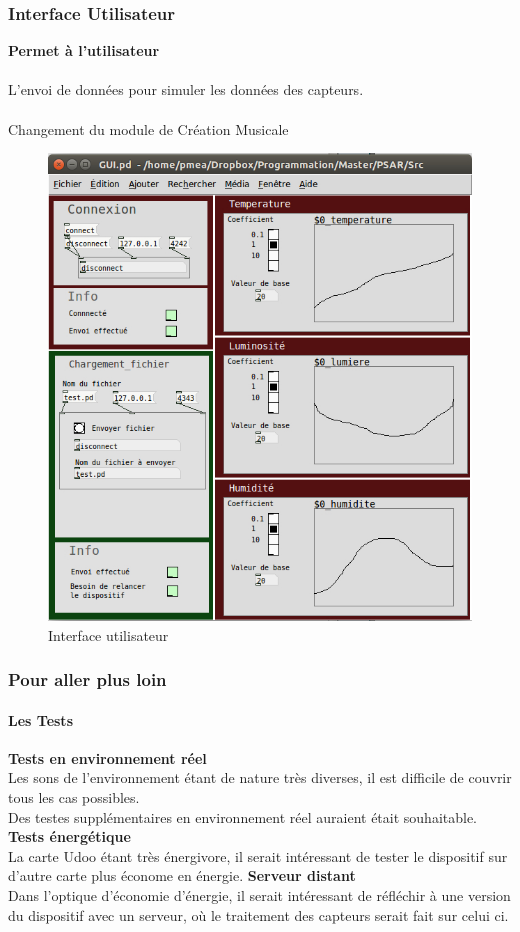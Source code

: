 \documentclass{beamer}
\begin{document}
\begin{frame}
\frametitle{Interface Utilisateur}
\begin{minipage}{0.49\textwidth}
\textbf{Permet à l'utilisateur}\\\\
L'envoi de données pour simuler les données des capteurs.\\\\
Changement du module de Création Musicale
\end{minipage}
\begin{minipage}{0.49\textwidth}
\begin{figure}
  \centering
  \includegraphics[width=\textwidth]{GUI.jpg} 
	\caption{Interface utilisateur}
\end{figure}
\end{minipage}
\end{frame}


\begin{frame}
\frametitle{Pour aller plus loin}
\framesubtitle{Les Tests}
\textbf{Tests en environnement réel}\\
Les sons de l'environnement étant de nature très diverses, il est difficile de couvrir tous les cas possibles.\\
Des testes supplémentaires en environnement réel auraient était souhaitable.
\newline
\newline
\textbf{Tests énergétique}\\
La carte Udoo étant très énergivore, il serait intéressant de tester le dispositif sur d'autre carte plus économe en énergie.
\newline
\newline
\textbf{Serveur distant}\\
Dans l'optique d'économie d’énergie, il serait intéressant de réfléchir à une version du dispositif avec un serveur, où le traitement des capteurs serait fait sur celui ci.
\end{frame}
\end{document}
